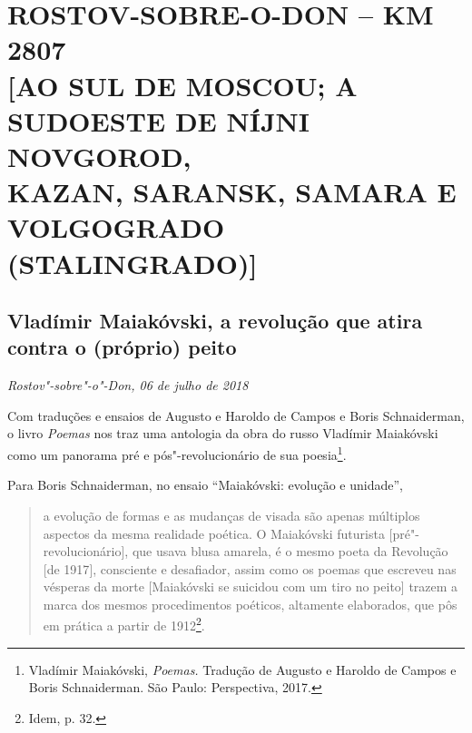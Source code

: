 


\movetooddpage
{}
\part*{ROSTOV-SOBRE-O-DON -- KM 2807\\{[}AO SUL DE MOSCOU; A\\SUDOESTE DE NÍJNI NOVGOROD,\\KAZAN, SARANSK, SAMARA E\\VOLGOGRADO (STALINGRADO){]}}


\chapter*{Vladímir Maiakóvski, a revolução que atira contra o (próprio) peito}

\begin{flushright}
\emph{Rostov"-sobre"-o"-Don, 06 de julho de 2018}
\end{flushright}

Com traduções e ensaios de Augusto e Haroldo de Campos e Boris
Schnaiderman, o livro \emph{Poemas} nos traz uma antologia da obra do
russo Vladímir Maiakóvski como um panorama pré e pós"-revolucionário de
sua poesia\footnote{Vladímir Maiakóvski, \emph{Poemas.} Tradução de
  Augusto e Haroldo de Campos e Boris Schnaiderman. São Paulo:
  Perspectiva, 2017.}.

Para Boris Schnaiderman, no ensaio ``Maiakóvski: evolução e unidade'',

\begin{quote}
a evolução de formas e as mudanças de visada são apenas múltiplos
aspectos da mesma realidade poética. O Maiakóvski futurista
{[}pré"-revolucionário{]}, que usava blusa amarela, é o mesmo poeta da
Revolução {[}de 1917{]}, consciente e desafiador, assim como os poemas
que escreveu nas vésperas da morte {[}Maiakóvski se suicidou com um tiro
no peito{]} trazem a marca dos mesmos procedimentos poéticos, altamente
elaborados, que pôs em prática a partir de 1912\footnote{Idem, p. 32.}.
\end{quote}

